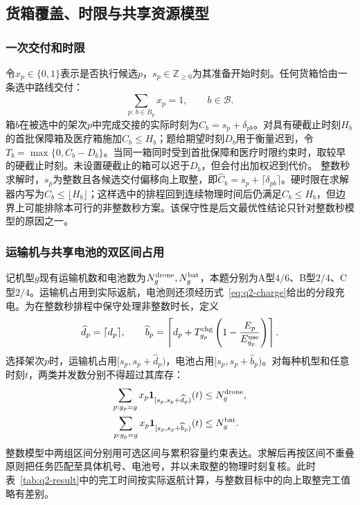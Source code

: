 \subsection{货箱覆盖、时限与共享资源模型}
\subsubsection{一次交付和时限}
令$x_p\in\{0,1\}$表示是否执行候选$p$，$s_p\in\mathbb Z_{\geq0}$为其准备开始时刻。任何货箱恰由一条选中路线交付：
\begin{equation}
\sum_{p:\,b\in B_p}x_p=1,\qquad b\in\mathcal B.
\label{eq:q2-cover}
\end{equation}
箱$b$在被选中的架次$p$中完成交接的实际时刻为$C_b=s_p+\delta_{pb}$。对具有硬截止时刻$H_b$的首批保障箱及医疗箱施加$C_b\le H_b$；题给期望时刻$D_b$用于衡量迟到，令$T_b=\max\{0,C_b-D_b\}$。当同一箱同时受到首批保障和医疗时限约束时，取较早的硬截止时刻。未设置硬截止的箱可以迟于$D_b$，但会付出加权迟到代价。
整数秒求解时，$s_p$为整数且各候选交付偏移向上取整，即$\widehat C_b=s_p+\lceil\delta_{pb}\rceil$。硬时限在求解器内写为$\widehat C_b\le\lfloor H_b\rfloor$；这样选中的排程回到连续物理时间后仍满足$C_b\le H_b$，但边界上可能排除本可行的非整数秒方案。该保守性是后文最优性结论只针对整数秒模型的原因之一。

\subsubsection{运输机与共享电池的双区间占用}
记机型$g$现有运输机数和电池数为$N_g^{\rm drone},N_g^{\rm bat}$，本题分别为A型$4/6$、B型$2/4$、C型$2/4$。运输机占用到实际返航，电池则还须经历式~\eqref{eq:q2-charge}给出的分段充电。为在整数秒排程中保守处理非整数时长，定义
\begin{equation}
\widehat d_p=\lceil d_p\rceil,\qquad
\widehat b_p=\left\lceil d_p+T_{g_p}^{\rm chg}
\left(1-\frac{E_p}{E_{g_p}^{\rm use}}\right)\right\rceil.
\label{eq:q2-reserved-length}
\end{equation}
选择架次$p$时，运输机占用$[s_p,s_p+\widehat d_p)$，电池占用$[s_p,s_p+\widehat b_p)$。对每种机型和任意时刻$t$，两类并发数分别不得超过其库存：
\begin{align}
\sum_{p:g_p=g}x_p\mathbf 1_{[s_p,s_p+\widehat d_p)}(t)
&\le N_g^{\rm drone},\\
\sum_{p:g_p=g}x_p\mathbf 1_{[s_p,s_p+\widehat b_p)}(t)
&\le N_g^{\rm bat}.
\label{eq:q2-cumulative}
\end{align}
整数模型中两组区间分别用可选区间与累积容量约束表达。求解后再按区间不重叠原则把任务匹配至具体机号、电池号，并以未取整的物理时刻复核。此时表~\ref{tab:q2-result}中的完工时间按实际返航计算，与整数目标中的向上取整完工值略有差别。


